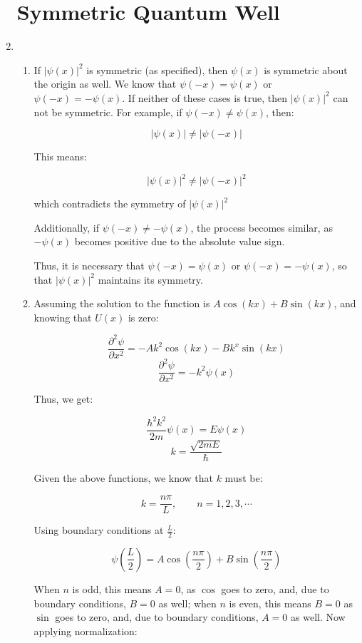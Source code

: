 \begin{enumerate}

    \section{Symmetric Quantum Well}

  \item 

    \begin{enumerate}

      \item If $|\psi(x)|^2$ is symmetric (as specified), then $\psi(x)$ is symmetric about the origin as well. We know that $\psi(-x)=\psi(x)$ or $\psi(-x)=-\psi(x)$. If neither of these cases is true, then $|\psi(x)|^2$ can not be symmetric. For example, if $\psi(-x)\neq\psi(x)$, then:

        $$|\psi(x)|\neq|\psi(-x)|$$

        This means:

        $$|\psi(x)|^2\neq|\psi(-x)|^2$$

        which contradicts the symmetry of $|\psi(x)|^2$

        Additionally, if $\psi(-x)\neq-\psi(x)$, the process becomes similar, as $-\psi(x)$ becomes positive due to the absolute value sign.

        Thus, it is necessary that $\psi(-x)=\psi(x)$ or $\psi(-x)=-\psi(x)$, so that $|\psi(x)|^2$ maintains its symmetry.

      \item Assuming the solution to the function is $A\cos(kx)+B\sin(kx)$, and knowing that $U(x)$ is zero:

        $$\frac{\partial^2\psi}{\partial x^2}=-Ak^2\cos(kx)-Bk^x\sin(kx)$$
        $$\frac{\partial^2\psi}{\partial x^2}=-k^2\psi(x)$$

        Thus, we get:

        $$\frac{\hbar^2k^2}{2m}\psi(x)=E\psi(x)$$
        $$k=\frac{\sqrt{2mE}}{\hbar}$$

        Given the above functions, we know that $k$ must be:

        $$k=\frac{n\pi}{L},\quad\quad n=1,2,3,\cdots$$

        Using boundary conditions at $\frac{L}{2}$:

        $$\psi\left( \frac{L}{2} \right)=A\cos\left( \frac{n\pi}{2} \right)+B\sin\left( \frac{n\pi}{2} \right)$$

        When $n$ is odd, this means $A=0$, as $\cos$ goes to zero, and, due to boundary conditions, $B=0$ as well; when $n$ is even, this means $B=0$ as $\sin$ goes to zero, and, due to boundary conditions, $A=0$ as well. Now applying normalization:\\


\end{enumerate}
\end{enumerate}
